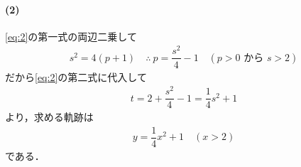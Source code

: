 \documentclass[../../main.tex]{subfiles}
\begin{document}
\paragraph{(2)}

\cref{eq:2}の第一式の両辺二乗して
\begin{align}
  s^2 = 4(p+1) \quad \therefore \ p = \dfrac{s^2}{4} - 1 \quad (p > 0 \text{ から } s > 2)
\end{align}
だから\cref{eq:2}の第二式に代入して
\begin{align}
  t = 2 + \dfrac{s^2}{4} - 1 = \dfrac{1}{4}s^2 + 1 \label{eq:3}
\end{align}
より，求める軌跡は
\begin{align}
  y = \dfrac{1}{4}x^2 + 1 \quad (x > 2)
\end{align}
である．
\end{document}
